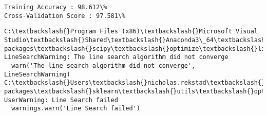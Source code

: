 \documentclass[11pt]{article}
\begin{document}
    \begin{Verbatim}[commandchars=\\\{\}]
Training Accuracy : 98.612\%
Cross-Validation Score : 97.581\%

    \end{Verbatim}

    \begin{Verbatim}[commandchars=\\\{\}]
C:\textbackslash{}Program Files (x86)\textbackslash{}Microsoft Visual Studio\textbackslash{}Shared\textbackslash{}Anaconda3\_64\textbackslash{}lib\textbackslash{}site-packages\textbackslash{}scipy\textbackslash{}optimize\textbackslash{}linesearch.py:313: LineSearchWarning: The line search algorithm did not converge
  warn('The line search algorithm did not converge', LineSearchWarning)
C:\textbackslash{}Users\textbackslash{}nicholas.rekstad\textbackslash{}AppData\textbackslash{}Roaming\textbackslash{}Python\textbackslash{}Python36\textbackslash{}site-packages\textbackslash{}sklearn\textbackslash{}utils\textbackslash{}optimize.py:195: UserWarning: Line Search failed
  warnings.warn('Line Search failed')

    \end{Verbatim}
\end{document}
